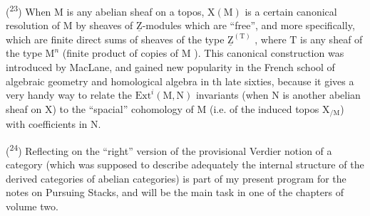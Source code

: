 (\textsuperscript{23}) When $\mathrm{M}$ is any abelian sheaf on a topos, $\mathrm{X}(\mathrm{M})$ is a certain canonical  resolution of $\mathrm{M}$ by sheaves of $\underline{\mathrm{Z}}$-modules which are ``free'', and more specifically, which are finite direct sums of sheaves of the type $\underline{\mathrm{Z}}^{(\mathrm{T})}$ , where $\mathrm{T}$ is any sheaf of the type $\mathrm{M}^{n}$ (finite product of copies of $\mathrm{M}$ ). This canonical construction was introduced  by MacLane, and gained new popularity in the French school of algebraic geometry and homological algebra in th late sixties, because  it gives a very handy way to relate the $\mathrm{Ext}^{i}(\mathrm{M},\mathrm{N})$ invariants (when $\mathrm{N}$ is another abelian sheaf on $\mathrm{X}$) to the  ``spacial'' cohomology of $\mathrm{M}$ (i.e. of the induced topos $\mathrm{X}_{/\mathrm{M}}$\deleted{\unsure{,}}) with coefficients in $\mathrm{N}$.

(\textsuperscript{24}) Reflecting on the ``right'' version of the provisional Verdier notion of a  category (which was supposed to describe adequately the  internal structure of the derived categories of abelian categories) is part of my present program for the notes on Pursuing Stacks, and will be the main task in one of the chapters of volume two.

